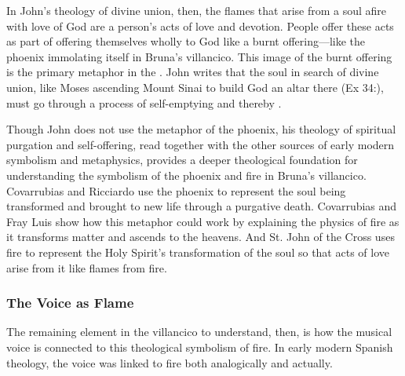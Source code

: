 In John's theology of divine union, then, the flames that arise from a soul afire with love of God are a person's acts of love and devotion.
People offer these acts as part of offering themselves wholly to God like a burnt offering---like the phoenix immolating itself in Bruna's villancico.
This image of the burnt offering is the primary metaphor in the . 
John writes that the soul in search of divine union, like Moses ascending Mount Sinai to build God an altar there (Ex 34:), must go through a process of self-emptying and thereby .%
	\autocite[191]{JuandelaCruz:Subida}

Though John does not use the metaphor of the phoenix, his theology of spiritual purgation and self-offering, read together with the other sources of early modern symbolism and metaphysics, provides a deeper theological foundation for understanding the symbolism of the phoenix and fire in Bruna's villancico.
Covarrubias and Ricciardo use the phoenix to represent the soul being transformed and brought to new life through a purgative death.
Covarrubias and Fray Luis show how this metaphor could work by explaining the physics of fire as it transforms matter and ascends to the heavens.
And St. John of the Cross uses fire to represent the Holy Spirit's transformation of the soul so that acts of love arise from it like flames from fire.

\subsubsection{The Voice as Flame}

The remaining element in the villancico to understand, then, is how the musical voice is connected to this theological symbolism of fire.
In early modern Spanish theology, the voice was linked to fire both analogically and actually.

